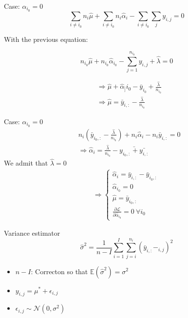 \documentclass[unknownkeysallowed]{beamer}
\begin{document}
\begin{frame}{Case: $\alpha_{i_0}=0$}
\[\sum\limits_{i\ne i_0}n_i\hat{\mu}+\sum\limits_{i\ne i_0}n_i\hat{\alpha}_i-\sum\limits_{i\ne i_0}\sum\limits_{j}y_{i,j}=0\]

With the previous equation:

\[n_{i_0}\hat{\mu}+n_{i_0}\hat{\alpha}_{i_0}-\sum\limits_{j=1}^{n_{i_0}}y_{i,j}+\hat{\lambda}=0\]

\begin{align*}
&\Longrightarrow \hat{\mu}+\hat{\alpha}_]{i_0}-\bar{y}_{i_0}+\frac{\hat{\lambda}}{n_{i_0}}\\
&\Longrightarrow \hat{\mu}=\bar{y}_{i,:}-\frac{\hat{\lambda}}{n_{i_0}}
\end{align*}
\end{frame}

\begin{frame}{Case: $\alpha_{i_0}=0$}
\begin{align*}
&n_i(\bar{y}_{i_0,:}-\frac{\hat{\lambda}}{n_{i_0}})+n_i\hat{\alpha}_i-n_i\bar{y}_{i,:}=0\\
&\Longrightarrow \hat{\alpha}_i=\frac{\hat{\lambda}}{n_{i_0}}-\bar{y_{i_0,:}+\bar{y_{i,:}}}
\end{align*}
We admit that $\hat{\lambda}=0$
\begin{align*}
    \Longrightarrow \begin{cases}
\hat{\alpha}_i=\bar{y}_{i,:}-\bar{y}_{i_0,:} \\
\hat{\alpha}_{i_0}=0\\
\hat{\mu}=\bar{y}_{i_0,:}\\
\frac{\partial \mathcal{L}}{\partial \hat\alpha_{i_0}}=0\ \forall i_0
\end{cases}
\end{align*}
\end{frame}

\begin{frame}{Variance estimator}
    \[\hat{\sigma}^2=\frac{1}{n-I}\sum\limits_{i=1}^{I}\sum\limits_{j=i}^{n_i}(\bar{y}_{i,:}-_{i,j})^2\]
    \begin{itemize}
        \item $n-I$: Correcton so that $\mathbb{E}(\hat{\sigma}^2)=\sigma^2$
        \item $y_{i,j}=\mu^{*}+\epsilon_{i,j}$
        \item $\epsilon_{i,j}\sim\mathcal{N}(0,\sigma^2)$ 
    \end{itemize}
\end{frame}
\end{document}

